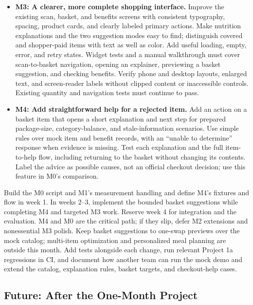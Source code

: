 \documentclass[sigconf]{acmart}
\begin{document}
\begin{itemize}
  \item \textbf{M3: A clearer, more complete shopping interface.}
  Improve the existing scan, basket, and benefits screens with consistent
  typography, spacing, product cards, and clearly labeled primary actions.
  Make nutrition explanations and the two suggestion modes easy to find;
  distinguish covered and shopper-paid items with text as well as color.
  Add useful loading, empty, error, and retry states. Widget tests and a manual
  walkthrough must cover scan-to-basket navigation, opening an explainer,
  previewing a basket suggestion, and checking benefits. Verify phone and
  desktop layouts, enlarged text, and screen-reader labels without clipped
  content or inaccessible controls. Existing quantity and navigation tests
  must continue to pass.

  \item \textbf{M4: Add straightforward help for a rejected item.}
  Add an action on a basket item that opens a short explanation and next step
  for prepared package-size, category-balance, and stale-information scenarios.
  Use simple rules over mock item and benefit records, with an ``unable to
  determine'' response when evidence is missing. Test each explanation and
  the full item-to-help flow, including returning to the basket without
  changing its contents. Label the advice as possible causes, not an official
  checkout decision; use this feature in M0's comparison.
\end{itemize}

Build the M0 script and M1's measurement handling and define M4's fixtures and
flow in week 1. In weeks 2--3, implement the bounded basket suggestions while
completing M4 and targeted M3 work. Reserve week 4 for integration and the
evaluation. M4 and M0 are the critical path; if they slip, defer M2 extensions
and nonessential M3 polish. Keep basket suggestions to one-swap previews over
the mock catalog; multi-item optimization and personalized meal planning are
outside this month. Add tests alongside each change, run relevant Project 1a
regressions in CI, and document how another team can run the mock demo and
extend the catalog, explanation rules, basket targets, and checkout-help cases.

\subsection{Future: After the One-Month Project}
\end{document}
